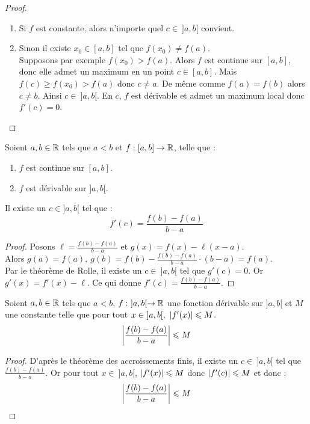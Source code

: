 \begin{proof}\cite{exo7_analyse1}
	\leavevmode
	\begin{enumerate}
		\item Si $f$ est constante, alors n'importe quel $c \in \ ]a, b[$ convient.
		\item Sinon il existe $x_0 \in [a, b]$ tel que $f(x_0) \neq f(a)$. 
		\\
		Supposons par exemple $f(x_0) > f(a)$. Alors $f$ est continue sur $[a, b]$, donc elle admet un maximum en un point $c \in [a, b]$. Mais $f(c) \geq f(x_0) > f(a)$ donc $c \neq a$. De même comme $f(a) = f(b)$ alors $c \neq b$. Ainsi $c \in \ ]a, b[$. En $c$, $f$ est dérivable et admet un maximum local donc $f'(c) = 0$.
	\end{enumerate}
\end{proof}

\begin{theorem}
    Soient $a, b \in \mathbb{R}$ tels que $a < b$ et $f : [a, b] \to \mathbb{R}$, telle que : 
    \begin{enumerate}
            \item $f$ est continue sur $[a, b]$.
            \item $f$ est dérivable sur $]a, b[$.
        \end{enumerate}
    \par \noindent Il existe un $c \in ]a, b[$ tel que :
	\[ f'(c) = \frac{f(b) - f(a)}{b - a} \]
\end{theorem}

\begin{proof}\cite{exo7_analyse1}
	Posons $\ell = \frac{f(b) - f(a)}{b - a}$ et $g(x) = f(x) - \ell (x - a)$.
	 \\
	 Alors $g(a) = f(a),\ g(b) = f(b) - \frac{f(b) - f(a)}{b - a} \cdot (b - a) = f(a)$.
	 \\
	  Par le théorème de Rolle, il existe un $c \in \ ]a, b[$ tel que $g'(c) = 0$. Or $g'(x) = f'(x) - \ell$. Ce qui donne $f'(c) = \frac{f(b) - f(a)}{b - a}$.
\end{proof}

\begin{corollary}
	Soient $a,b \in \mathbb{R}$ tels que $a < b$, $f : \ ]a, b[ \to \mathbb{R}$ une fonction dérivable sur $]a, b[$ et $M$ une constante telle que pour tout $x \in \ ]a, b[,\ \abs{f'(x)} \leqslant M$.
	\[ \abs{\frac{f(b) - f(a)}{b - a}} \leqslant M \]
\end{corollary}

\begin{proof}
	D'après le théorème des accroissements finis, il existe un $c \in \ ]a, b[$ tel que $\frac{f(b) - f(a)}{b - a}$. Or pour tout $x \in \ ]a, b[$, $\abs{f'(x)} \leqslant M$ donc $\abs{f'(c)} \leqslant M$ et donc :
	\[ \abs{\frac{f(b) - f(a)}{b - a}} \leqslant M \]
\end{proof}

